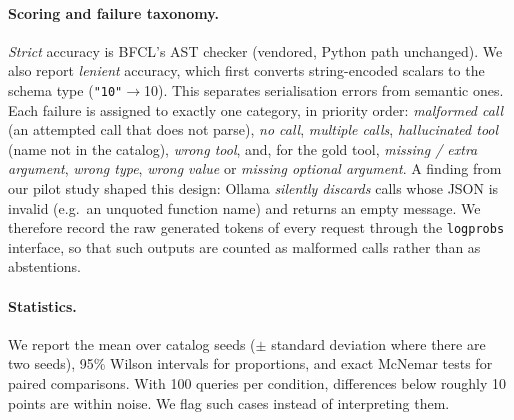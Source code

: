 \paragraph{Scoring and failure taxonomy.}
\emph{Strict} accuracy is BFCL's AST checker (vendored, Python path unchanged).
We also report \emph{lenient} accuracy, which first converts string-encoded scalars to the schema type (\texttt{"10"}$\to$10). This separates serialisation errors from semantic ones.
Each failure is assigned to exactly one category, in priority order:
\textit{malformed call} (an attempted call that does not parse),
\textit{no call},
\textit{multiple calls},
\textit{hallucinated tool} (name not in the catalog),
\textit{wrong tool},
and, for the gold tool, \textit{missing / extra argument}, \textit{wrong type}, \textit{wrong value} or \textit{missing optional argument}.
A finding from our pilot study shaped this design: Ollama \emph{silently discards} calls whose JSON is invalid (e.g.\ an unquoted function name) and returns an empty message. We therefore record the raw generated tokens of every request through the \texttt{logprobs} interface, so that such outputs are counted as malformed calls rather than as abstentions.

\paragraph{Statistics.}
We report the mean over catalog seeds ($\pm$ standard deviation where there are two seeds), 95\% Wilson intervals for proportions, and exact McNemar tests for paired comparisons.
With 100 queries per condition, differences below roughly 10 points are within noise. We flag such cases instead of interpreting them.
